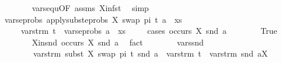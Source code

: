 \begin{isabellebody}
\ \ \ \ \ \ \isamarkupfalse%
\ vars{\isacharunderscore}{\kern0pt}equ{\isacharbrackleft}{\kern0pt}OF\ assms\ X{\isacharunderscore}{\kern0pt}in{\isacharunderscore}{\kern0pt}fst{\isacharbrackright}{\kern0pt}\ \isamarkupfalse%
\ simp\isanewline
\ \ \ \ \isamarkupfalse%
\ \isamarkupfalse%
\ {\isachardoublequoteopen}vars{\isacharunderscore}{\kern0pt}eprobs\ {\isacharparenleft}{\kern0pt}apply{\isacharunderscore}{\kern0pt}subst{\isacharunderscore}{\kern0pt}eprobs\ {\isacharbrackleft}{\kern0pt}{\isacharparenleft}{\kern0pt}X{\isacharcomma}{\kern0pt}\ swap\ pi\ t{\isacharparenright}{\kern0pt}{\isacharbrackright}{\kern0pt}\ {\isacharparenleft}{\kern0pt}a\ {\isacharhash}{\kern0pt}\ xs{\isacharparenright}{\kern0pt}{\isacharparenright}{\kern0pt}\isanewline
\ \ \ \ {\isasymsubseteq}\ vars{\isacharunderscore}{\kern0pt}trm\ t\ {\isasymunion}\ vars{\isacharunderscore}{\kern0pt}eprobs\ {\isacharparenleft}{\kern0pt}a\ {\isacharhash}{\kern0pt}\ xs{\isacharparenright}{\kern0pt}{\isachardoublequoteclose}\isanewline
\ \ \ \ \isamarkupfalse%
{\isacharparenleft}{\kern0pt}cases\ {\isachardoublequoteopen}occurs\ X\ {\isacharparenleft}{\kern0pt}snd\ a{\isacharparenright}{\kern0pt}{\isachardoublequoteclose}{\isacharparenright}{\kern0pt}\isanewline
\ \ \ \ \ \ \isamarkupfalse%
\ True\isanewline
\ \ \ \ \ \ \isamarkupfalse%
\ X{\isacharunderscore}{\kern0pt}in{\isacharunderscore}{\kern0pt}snd{\isacharcolon}{\kern0pt}\ {\isachardoublequoteopen}occurs\ X\ {\isacharparenleft}{\kern0pt}snd\ a{\isacharparenright}{\kern0pt}{\isachardoublequoteclose}\ \isamarkupfalse%
\ fact\isanewline
\ \ \ \ \ \ \isamarkupfalse%
\ vars{\isacharunderscore}{\kern0pt}snd{\isacharcolon}{\kern0pt}\isanewline
\ \ \ \ \ \ \ \ {\isachardoublequoteopen}vars{\isacharunderscore}{\kern0pt}trm\ {\isacharparenleft}{\kern0pt}subst\ {\isacharbrackleft}{\kern0pt}{\isacharparenleft}{\kern0pt}X{\isacharcomma}{\kern0pt}\ swap\ pi\ t{\isacharparenright}{\kern0pt}{\isacharbrackright}{\kern0pt}\ {\isacharparenleft}{\kern0pt}snd\ a{\isacharparenright}{\kern0pt}{\isacharparenright}{\kern0pt}\ {\isacharequal}{\kern0pt}\ {\isacharparenleft}{\kern0pt}vars{\isacharunderscore}{\kern0pt}trm\ t\ {\isasymunion}\ vars{\isacharunderscore}{\kern0pt}trm\ {\isacharparenleft}{\kern0pt}snd\ a{\isacharparenright}{\kern0pt}{\isacharparenright}{\kern0pt}{\isacharminus}{\kern0pt}{\isacharbraceleft}{\kern0pt}X{\isacharbraceright}{\kern0pt}{\isachardoublequoteclose}\isanewline

\end{isabellebody}
